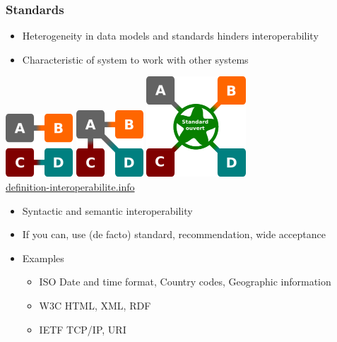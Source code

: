 \documentclass{beamer}
\begin{document}
\begin{frame}
  \frametitle{Standards}
  
  \begin{itemize}
  \item Heterogeneity in data models and standards hinders interoperability
  \item Characteristic of system to work with other systems
  \end{itemize}
  \begin{center}
    \includegraphics[scale=0.5]{graphics/compatibility.png}\hspace{0.5cm}
    \includegraphics[scale=0.47]{graphics/de-facto-standard.png}\hspace{0.5cm}
    \includegraphics[scale=0.31]{graphics/interoperability.png}\\
    \tiny\url{definition-interoperabilite.info}
  \end{center}
  \begin{itemize}
  \item Syntactic and semantic interoperability
  \item If you can, use (de facto) standard, recommendation, wide acceptance
  \item Examples
    \begin{itemize}
    \item ISO Date and time format, Country codes, Geographic information
    \item W3C HTML, XML, RDF
    \item IETF TCP/IP, URI
    \end{itemize}
  \end{itemize}
\end{frame}
\end{document}

